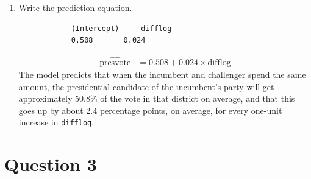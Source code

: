 \documentclass[12pt,letterpaper]{article}
\begin{document}
\begin{enumerate}
		\item Write the prediction equation.
		
		\begin{verbatim}
			(Intercept)     difflog 
			0.508       0.024 
		\end{verbatim}
		
		\begin{align*}
			\widehat{\text{presvote}} &= 0.508 + 0.024 \times \text{difflog}
		\end{align*}
		\noindent The model predicts that when the incumbent and challenger spend the same amount, the presidential candidate of the incumbent's party will get approximately 50.8\% of the vote in that district on average, and that this goes up by about 2.4 percentage points, on average, for every one-unit increase in \texttt{difflog}.
	\end{enumerate}
	
	\newpage	
\section*{Question 3}
\end{document}
